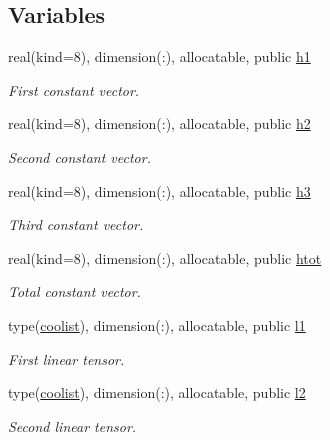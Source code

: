 \subsection*{Variables}
\begin{DoxyCompactItemize}
\item 
real(kind=8), dimension(\+:), allocatable, public \hyperlink{namespacemtv__int__tensor_a8979293cdfe7d9e67f3348a444076f3c}{h1}
\begin{DoxyCompactList}\small\item\em First constant vector. \end{DoxyCompactList}\item 
real(kind=8), dimension(\+:), allocatable, public \hyperlink{namespacemtv__int__tensor_ad0dd8bb28d5e88e5776c48b302ae4b29}{h2}
\begin{DoxyCompactList}\small\item\em Second constant vector. \end{DoxyCompactList}\item 
real(kind=8), dimension(\+:), allocatable, public \hyperlink{namespacemtv__int__tensor_a596c16bed479b011818d66810e590bae}{h3}
\begin{DoxyCompactList}\small\item\em Third constant vector. \end{DoxyCompactList}\item 
real(kind=8), dimension(\+:), allocatable, public \hyperlink{namespacemtv__int__tensor_aa82b34ace4bb21fbfc0e37ccc3db4815}{htot}
\begin{DoxyCompactList}\small\item\em Total constant vector. \end{DoxyCompactList}\item 
type(\hyperlink{structtensor_1_1coolist}{coolist}), dimension(\+:), allocatable, public \hyperlink{namespacemtv__int__tensor_a2dbd181e62dbbb9aedcbd6535ca56ec5}{l1}
\begin{DoxyCompactList}\small\item\em First linear tensor. \end{DoxyCompactList}\item 
type(\hyperlink{structtensor_1_1coolist}{coolist}), dimension(\+:), allocatable, public \hyperlink{namespacemtv__int__tensor_aa6dcec8a4783e982cd8894a15ae210d4}{l2}
\begin{DoxyCompactList}\small\item\em Second linear tensor. \end{DoxyCompactList}\item 

\end{DoxyCompactItemize}
